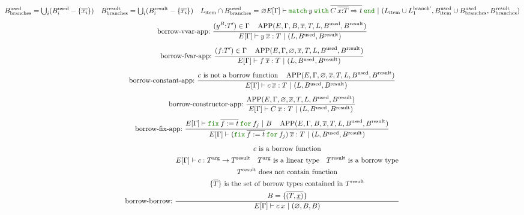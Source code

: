 \documentclass[a4paper,fleqn]{article}
\newcommand{\kwmatch}{\mbox{\color{mygreen}\ttfamily match}}
\newcommand{\kwwith}{\mbox{\color{mygreen}\ttfamily with}}
\newcommand{\kwend}{\mbox{\color{mygreen}\ttfamily end}}
\newcommand{\kwfix}{\mbox{\color{mygreen}\ttfamily fix}}
\newcommand{\kwfor}{\mbox{\color{mygreen}\ttfamily for}}
\newcommand{\lassum}[2]{(#1\mathord{:}#2)}
\newcommand{\omatch}[2]{\kwmatch\:#1\:\kwwith\:{#2}\:\kwend}
\newcommand{\ofix}[2]{\kwfix\:{#1}\:\kwfor\:{#2}}
\newcommand{\tbigcup}{{\textstyle\bigcup}}
\newcommand{\breakrule}{\\[0.5em]}
\DeclareMathOperator{\APP}{APP}
\newcommand{\rep}[1]{\overline{#1}}
\begin{document}
\begin{gather*}
{\begin{gathered}
        B^\text{used}_\text{branches} = \tbigcup_i ({B^\text{used}_i - \{\rep{x_i}\}}) \quad
        B^\text{result}_\text{branches} = \tbigcup_i (B^\text{result}_i - \{\rep{x_i}\}) \quad
        L_\text{item} \cap B^\text{used}_\text{branches} = \varnothing \\
      \end{gathered}
    }{
      E[\Gamma] \vdash \omatch{y}{\rep{C\: \rep{x{:}T} \Rightarrow t}} ~|~ (L_\text{item} \cup L^\text{branch'}_1, B^\text{used}_\text{item} \cup B^\text{used}_\text{branches}, B^\text{result}_\text{branches})
    } \breakrule
  \text{borrow-vvar-app:}~
    \dfrac{
      \begin{gathered}
        \lassum{y^{B}}{T'} \in \Gamma \quad
        \APP(E, \Gamma, B, \rep{x}, T, L, B^\text{used}, B^\text{result})
      \end{gathered}
    }{
      E[\Gamma] \vdash y\:\rep{x} : T ~|~ (L, B^\text{used}, B^\text{result})
    } \breakrule
  \text{borrow-fvar-app:}~
    \dfrac{
      \begin{gathered}
        \lassum{f}{T'} \in \Gamma \quad
        \APP(E, \Gamma, \varnothing, \rep{x}, T, L, B^\text{used}, B^\text{result})
      \end{gathered}
    }{
      E[\Gamma] \vdash f\:\rep{x} : T ~|~ (L, B^\text{used}, B^\text{result})
    } \breakrule
  \text{borrow-constant-app:}~
    \dfrac{
      \begin{gathered}
        \text{$c$ is not a borrow function} \quad
        \APP(E, \Gamma, \varnothing, \rep{x}, T, L, B^\text{used}, B^\text{result})
      \end{gathered}
    }{
      E[\Gamma] \vdash c\:\rep{x} : T ~|~ (L, B^\text{used}, B^\text{result})
    } \breakrule
  \text{borrow-constructor-app:}~
    \dfrac{
      \APP(E, \Gamma, \varnothing, \rep{x}, T, L, B^\text{used}, B^\text{result})
    }{
      E[\Gamma] \vdash C\: \rep{x} : T ~|~ (L, B^\text{used}, B^\text{result})
    } \breakrule
  \text{borrow-fix-app:}~
    \dfrac{
      \begin{gathered}
        E[\Gamma] \vdash \ofix{\rep{f:=t}}{f_j} ~|~ B \quad
        \APP(E, \Gamma, B, \rep{x}, T, L, B^\text{used}, B^\text{result})
      \end{gathered}
    }{
      E[\Gamma] \vdash (\ofix{\rep{f:=t}}{f_j})\:\rep{x} : T ~|~ (L, B^\text{used}, B^\text{result})
    } \breakrule
  \text{borrow-borrow:}~
    \dfrac{
      \begin{gathered}
        \text{$c$ is a borrow function} \\
        E[\Gamma] \vdash c : T^\text{arg} \rightarrow T^\text{result} \quad
        \text{$T^\text{arg}$ is a linear type} \quad
        \text{$T^\text{result}$ is a borrow type} \\
        \text{$T^\text{result}$ does not contain function} \\
        \text{$\{\rep{T}\}$ is the set of borrow types contained in $T^\text{result}$} \\
        B = \{\rep{(T,\underline{x})}\}
      \end{gathered}
    }{
      E[\Gamma] \vdash c\:x ~|~ (\varnothing, B, B)
    }
\end{gather*}
\end{document}
